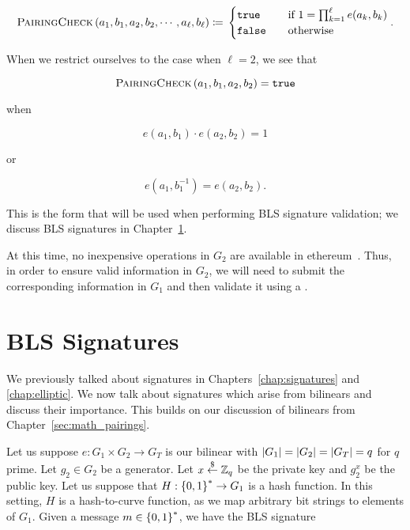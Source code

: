 \begin{equation}
    \textsc{PairingCheck}{}\left( a_{1}, b_{1}, a_{2}, b_{2}, \cdots,
            a_{\ell},b_{\ell} \right)
        \coloneqq{} \begin{cases}
            \texttt{true} \quad &\text{if }1 =\prod_{k=1}^{\ell}e(a_{k},b_{k})\\
            \texttt{false} \quad &\text{otherwise}
        \end{cases}.
\end{equation}

\noindent
When we restrict ourselves to the case when $\ell=2$, we see that

\begin{equation}
    \textsc{PairingCheck}{}\left( a_{1}, b_{1}, a_{2}, b_{2} \right) = \texttt{true}
\end{equation}

\noindent
when

\begin{equation}
    e(a_{1},b_{1}) \cdot e(a_{2},b_{2}) = 1
\end{equation}

\noindent
or

\begin{equation}
    e(a_{1},b_{1}^{-1}) = e(a_{2},b_{2}).
\end{equation}

\noindent
This is the form that will be used when performing
BLS signature validation;
we discuss BLS signatures in Chapter~\ref{sec:pairing_bls}.

At this time, no inexpensive operations in $G_{2}$ are available
in \gls{ethereum}~\cite{EthereumYellowpaper}.
Thus, in order to ensure valid information in $G_{2}$,
we will need to submit the corresponding information
in $G_{1}$ and then validate it using a \PairingCheck{}.



\section{BLS Signatures}
\label{sec:pairing_bls}

We previously talked about \glspl{signature} in Chapters~\ref{chap:signatures}
and \ref{chap:elliptic}.
We now talk about \glspl{signature} which arise from \glspl{bilinear}
and discuss their importance.
This builds on our discussion of \glspl{bilinear}
from Chapter~\ref{sec:math_pairings}.

Let us suppose $e:G_{1}\times G_{2}\to G_{T}$ is our \gls{bilinear}
with $\left| G_{1} \right| = \left| G_{2} \right| = \left| G_{T} \right| = q$ for $q$ prime.
Let $g_{2}\in G_{2}$ be a generator.
Let $x \stackrel{\$}{\leftarrow} \mathbb{Z}_{q}$ be the private key
and $g_{2}^{x}$ be the public key.
Let us suppose that $H:\left\{ 0,1 \right\}^{*}\to G_{1}$ is a \gls{hash function}.
In this setting, $H$ is a hash-to-curve function,
as we map arbitrary bit strings to elements of $G_{1}$.
Given a message $m\in\left\{ 0,1 \right\}^{*}$, we have the BLS signature

